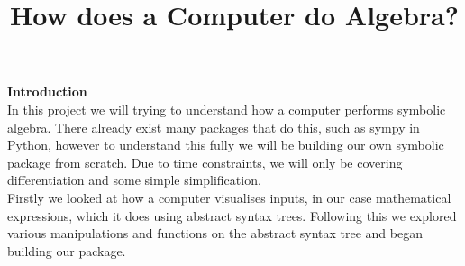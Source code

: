 \documentclass[12pt]{article}
\author{}
\title{\textbf{How does a Computer do Algebra?}}
\date{}
\begin{document}
\maketitle
\newpage


\textbf{Introduction}\\
In this project we will trying to understand how a computer performs symbolic algebra. There already exist many packages that do this, such as sympy in Python, however to understand this fully we will be building our own symbolic package from scratch. Due to time constraints, we will only be covering differentiation and some simple simplification.\\
Firstly we looked at how a computer visualises inputs, in our case mathematical expressions, which it does using abstract syntax trees. Following this we explored various manipulations and functions on the abstract syntax tree and began building our package.
\end{document}
